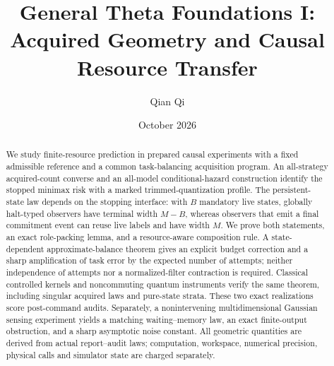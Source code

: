 \documentclass[11pt,reqno]{amsart}
\title[Acquired geometry and causal resource transfer]{General Theta Foundations I:\\Acquired Geometry and Causal Resource Transfer}
\author{Qian Qi}\date{October 2026}
\numberwithin{equation}{section}
\theoremstyle{definition}
\theoremstyle{remark}
\begin{document}
\begin{abstract}
We study finite-resource prediction in prepared causal experiments with a fixed admissible reference and a common task-balancing acquisition program. An all-strategy acquired-count converse and an all-model conditional-hazard construction identify the stopped minimax risk with a marked trimmed-quantization profile. The persistent-state law depends on the stopping interface: with $B$ mandatory live states, globally halt-typed observers have terminal width $M-B$, whereas observers that emit a final commitment event can reuse live labels and have width $M$. We prove both statements, an exact role-packing lemma, and a resource-aware composition rule. A state-dependent approximate-balance theorem gives an explicit budget correction and a sharp amplification of task error by the expected number of attempts; neither independence of attempts nor a normalized-filter contraction is required. Classical controlled kernels and noncommuting quantum instruments verify the same theorem, including singular acquired laws and pure-state strata. These two exact realizations score post-command audits. Separately, a nonintervening multidimensional Gaussian sensing experiment yields a matching waiting--memory law, an exact finite-output obstruction, and a sharp asymptotic noise constant. All geometric quantities are derived from actual report--audit laws; computation, workspace, numerical precision, physical calls and simulator state are charged separately.
\end{abstract}
\maketitle












\appendix



\end{document}
